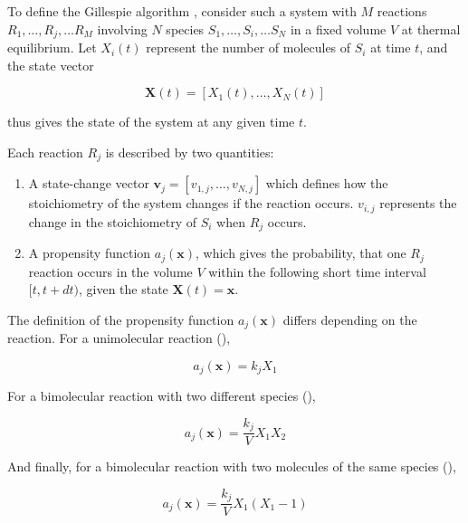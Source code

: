 To define the Gillespie algorithm \parencite{gillespieStochasticSimulationChemical2007}, consider such a system with $M$ reactions $R_{1}, \ldots , R_{j}, \ldots R_{M}$ involving $N$ species $S_{1}, \ldots , S_{i}, \ldots S_{N}$ in a fixed volume $V$ at thermal equilibrium.
Let $X_{i}(t)$ represent the number of molecules of $S_{i}$ at time $t$, and the state vector

\begin{equation}
  \mathbf{X}(t) = [X_{1}(t), \ldots , X_{N}(t)]
  \label{eq:gillespie-statevector}
\end{equation}

thus gives the state of the system at any given time $t$.

\pagebreak

Each reaction $R_{j}$ is described by two quantities:
\begin{enumerate}
  \item A state-change vector $\mathbf{v}_{j} = [v_{1,j}, \ldots , v_{N,j}]$ which defines how the stoichiometry of the system changes if the reaction occurs.
        $v_{i,j}$ represents the change in the stoichiometry of $S_{i}$ when $R_{j}$ occurs.
  \item A propensity function $a_{j}(\mathbf{x})$, which gives the probability, that one $R_{j}$ reaction occurs in the volume $V$ within the following short time interval $[t, t+dt)$, given the state $\mathbf{X}(t) = \mathbf{x}$.
\end{enumerate}

The definition of the propensity function $a_{j}(\mathbf{x})$ differs depending on the reaction.
For a unimolecular reaction (),

\begin{equation}
  a_{j}(\mathbf{x}) = k_{j}X_{1}
  \label{eq:gillespie-propensity-unimolecular}
\end{equation}

For a bimolecular reaction with two different species (),

\begin{equation}
  a_{j}(\mathbf{x}) = \frac{k_{j}}{V} X_{1}X_{2}
  \label{eq:gillespie-propensity-bimolecular-different}
\end{equation}

And finally, for a bimolecular reaction with two molecules of the same species (),

\begin{equation}
  a_{j}(\mathbf{x}) = \frac{k_{j}}{V} X_{1}(X_{1} - 1)
  \label{eq:gillespie-propensity-bimolecular-same}
\end{equation}

